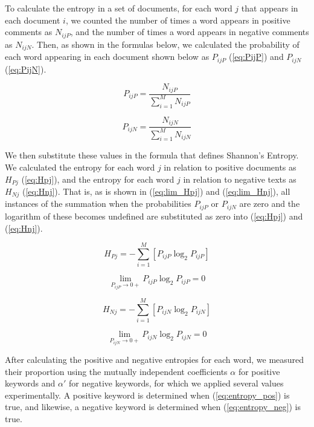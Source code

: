 \documentclass[review]{elsarticle}
\begin{document}
To calculate the entropy in a set of documents, for each word \(j\) that appears in each document \(i\), we counted the number of times a word appears in positive comments as \(N_{ijP}\), and the number of times a word appears in negative comments as \(N_{ijN}\). Then, as shown in the formulas below, we calculated the probability of each word appearing in each document shown below as \(P_{ijP}\) (\ref{eq:PijP}) and \(P_{ijN}\) (\ref{eq:PijN}).

\begin{equation}\label{eq:PijP}
P_{ijP} = \frac{N_{ijP}}{\sum_{i=1}^M N_{ijP}}
\end{equation}

\begin{equation}\label{eq:PijN}
P_{ijN} = \frac{N_{ijN}}{\sum_{i=1}^M N_{ijN}}
\end{equation}

We then substitute these values in the formula that defines Shannon’s Entropy. We calculated the entropy for each word \(j\) in relation to positive documents as \(H_{Pj}\) (\ref{eq:Hpj}), and the entropy for each word \(j\) in relation to negative texts as \(H_{Nj}\) (\ref{eq:Hnj}). That is, as is shown in (\ref{eq:lim_Hpj}) and (\ref{eq:lim_Hnj}), all instances of the summation when the probabilities \(P_{ijP}\) or \(P_{ijN}\) are zero and the logarithm of these becomes undefined are substituted as zero into (\ref{eq:Hpj}) and (\ref{eq:Hnj}).

\begin{equation}\label{eq:Hpj}
H_{Pj} = - \sum_{i=1}^M [P_{ijP}\log_2 P_{ijP}]
\end{equation}

\begin{equation}\label{eq:lim_Hpj}
\lim_{P_{ijP}\to0+} P_{ijP}\log_2 P_{ijP} = 0
\end{equation}

\begin{equation}\label{eq:Hnj}
H_{Nj} = - \sum_{i=1}^M [P_{ijN}\log_2 P_{ijN}]
\end{equation}

\begin{equation}\label{eq:lim_Hnj}
\lim_{P_{ijN}\to0+} P_{ijN}\log_2 P_{ijN} = 0
\end{equation}

After calculating the positive and negative entropies for each word, we measured their proportion using the mutually independent coefficients \(\alpha\) for positive keywords and \(\alpha'\) for negative keywords, for which we applied several values experimentally. A positive keyword is determined when (\ref{eq:entropy_pos}) is true, and likewise, a negative keyword is determined when (\ref{eq:entropy_neg}) is true.
\end{document}
